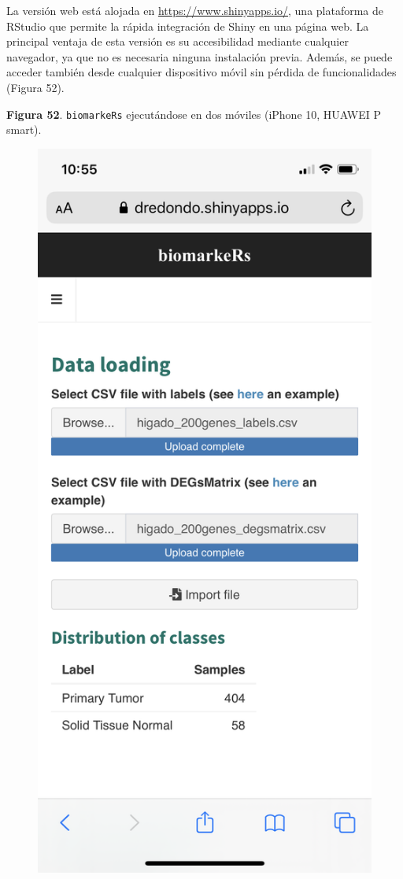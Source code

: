 La versión web está alojada en \url{https://www.shinyapps.io/}, una plataforma de RStudio que permite la rápida integración de Shiny en una página web. La principal ventaja de esta versión es su accesibilidad mediante cualquier navegador, ya que no es necesaria ninguna instalación previa. Además, se puede acceder también desde cualquier dispositivo móvil sin pérdida de funcionalidades (Figura 52).\\

\newpage
\begin{center}
	\textbf{Figura 52}.  \texttt{biomarkeRs} ejecutándose en dos móviles (iPhone 10, HUAWEI P smart).

	\begin{figure}[H]
		\centering
		\begin{minipage}{.5\textwidth}
			\centering
			\includegraphics[width=.75\textwidth]{figuras/52_app_iphone.png}

\end{minipage}
\end{figure}
\end{center}
